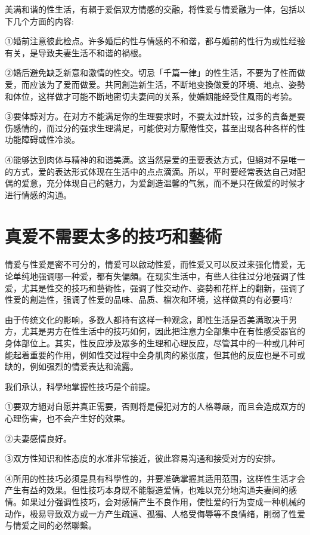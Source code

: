 \documentclass[12pt,UTF8]{ctexbook}
\begin{document}
美满和谐的性生活，有賴于爱侣双方情感的交融，将性爱与情爱融为一体，包括以下几个方面的内容:

①婚前注意彼此检点。许多婚后的性与情感的不和谐，都与婚前的性行为或性经验有关，是导致夫妻生活不和谐的禍根。

②婚后避免缺乏新意和激情的性交。切忌「千篇一律」的性生活，不要为了性而做爱，而应该为了爱而做爱。共同創造新生活，不断地变換做爱的环境、地点、姿勢和体位，这样做才可能不断地密切夫妻间的关系，使婚姻能经受住風雨的考验。

③要体諒对方。在对方不能满足你的生理要求时，不要太过計较，过多的責备是要伤感情的，而过分的强求生理满足，可能使对方厭倦性交，甚至出现各种各样的性功能障碍或性冷淡。

④能够达到肉体与精神的和谐美满。这当然是爱的重要表达方式，但絕对不是唯一的方式，爱的表达形式体现在生活中的点点滴滴。所以，平时要经常表达自己对配偶的爱意，充分体现自己的魅力，为爱創造温馨的气氛，而不是只在做爱的时候才进行情感的沟通。

\section{真爱不需要太多的技巧和藝術}

情爱与性爱是密不可分的，情爱可以啟动性爱，而性爱又可以反过来强化情爱，无论单纯地强调哪一种爱，都有失偏頗。在现实生活中，有些人往往过分地强调了性爱，尤其是性交的技巧和藝術性，强调了性交动作、姿勢和花样上的翻新，强调了性爱的創造性，强调了性爱的品味、品质、檔次和环境，这样做真的有必要吗?

由于传统文化的影响，多数人都持有这样一种观念，即性生活是否美满取决于男方，尤其是男方在性生活中的技巧如何，因此把注意力全部集中在有性感受器官的身体部位上。其实，性反应涉及眾多的生理和心理反应，尽管其中的一种或几种可能起着重要的作用，例如性交过程中全身肌肉的紧张度，但其他的反应也是不可或缺的，例如强烈的情爱表达和流露。

我们承认，科學地掌握性技巧是个前提。

①要双方絕对自愿并真正需要，否则将是侵犯对方的人格尊嚴，而且会造成双方的心理伤害，也不会产生好的效果。

②夫妻感情良好。

③双方性知识和性态度的水准非常接近，彼此容易沟通和接受对方的安排。

④所用的性技巧必须是具有科學性的，并要准确掌握其适用范围，这样性生活才会产生有益的效果。但性技巧本身既不能製造爱情，也难以充分地沟通夫妻间的感情。如果过分强调性技巧，会对感情产生不良作用，使性爱的行为变成一种机械的动作，极易导致双方或一方产生疏遠、孤獨、人格受侮辱等不良情绪，削弱了性爱与情爱之间的必然聯繫。
\end{document}
